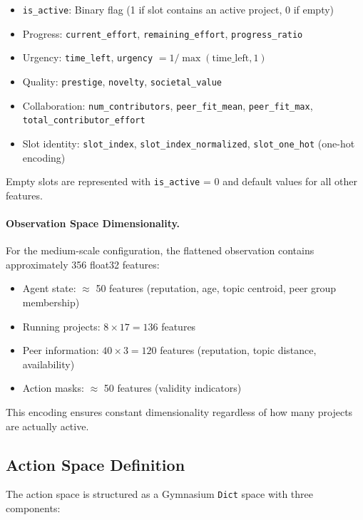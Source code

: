 \documentclass[english,bachelor]{hsluthesis}
\begin{document}
\begin{itemize}
    \item \texttt{is\_active}: Binary flag (1 if slot contains an active project, 0 if empty)
    \item Progress: \texttt{current\_effort}, \texttt{remaining\_effort}, \texttt{progress\_ratio}
    \item Urgency: \texttt{time\_left}, \texttt{urgency} $= 1 / \max(\text{time\_left}, 1)$
    \item Quality: \texttt{prestige}, \texttt{novelty}, \texttt{societal\_value}
    \item Collaboration: \texttt{num\_contributors}, \texttt{peer\_fit\_mean}, \texttt{peer\_fit\_max}, \texttt{total\_contributor\_effort}
    \item Slot identity: \texttt{slot\_index}, \texttt{slot\_index\_normalized}, \texttt{slot\_one\_hot} (one-hot encoding)
\end{itemize}

Empty slots are represented with \texttt{is\_active} = 0 and default values for all other features.

\paragraph{Observation Space Dimensionality.}
For the medium-scale configuration, the flattened observation contains approximately 356 float32 features:

\begin{itemize}
    \item Agent state: $\approx$ 50 features (reputation, age, topic centroid, peer group membership)
    \item Running projects: $8 \times 17 = 136$ features
    \item Peer information: $40 \times 3 = 120$ features (reputation, topic distance, availability)
    \item Action masks: $\approx$ 50 features (validity indicators)
\end{itemize}

This encoding ensures constant dimensionality regardless of how many projects are actually active.

\subsection{Action Space Definition}

The action space is structured as a Gymnasium \texttt{Dict} space with three components:
\end{document}
